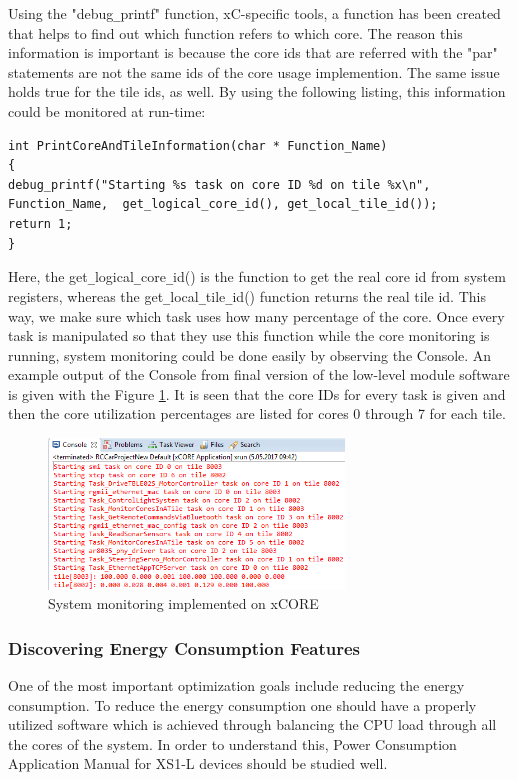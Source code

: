 Using the "debug\texttt{\_}printf" function, xC-specific tools, a function has been created that helps to find out which function refers to which core. The reason this information is important is because the core ids that are referred with the "par" statements are not the same ids of the core usage implemention. The same issue holds true for the tile ids, as well. By using the following listing, this information could be monitored at run-time:

\newpage\begin{lstlisting}
int PrintCoreAndTileInformation(char * Function_Name)
{
debug_printf("Starting %s task on core ID %d on tile %x\n", Function_Name, 	get_logical_core_id(), get_local_tile_id());
return 1;
}
\end{lstlisting}

Here, the get\texttt{\_}logical\texttt{\_}core\texttt{\_}id() is the function to get the real core id from system registers, whereas the get\texttt{\_}local\texttt{\_}tile\texttt{\_}id() function returns the real tile id. This way, we make sure which task uses how many percentage of the core. Once every task is manipulated so that they use this function while the core monitoring is running, system monitoring could be done easily by observing the Console. An example output of the Console from final version of the low-level module software is given with the Figure \ref{fig:finalmonitoring}. It is seen that the core IDs for every task is given and then the core utilization percentages are listed for cores 0 through 7 for each tile.

\begin{figure}[!ht]
	\centering
	\includegraphics[width=0.7\textwidth]{content/images/finalmonitoring.png}
	\caption{System monitoring implemented on xCORE}
	\label{fig:finalmonitoring}
\end{figure}

\subsubsection{Discovering Energy Consumption Features}
One of the most important optimization goals include reducing the energy consumption. To reduce the energy consumption one should have a properly utilized software which is achieved through balancing the CPU load through all the cores of the system. In order to understand this, Power Consumption Application Manual for XS1-L devices \cite{xs1energymanual} should be studied well. 

